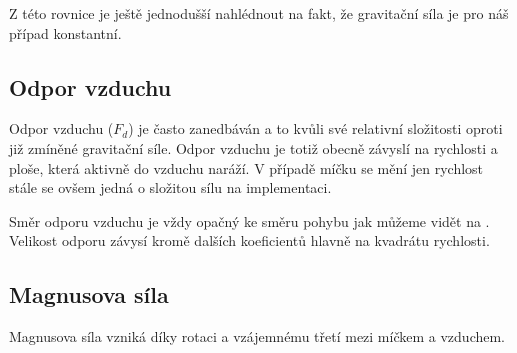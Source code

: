 Z této rovnice je ještě jednodušší nahlédnout na fakt, že gravitační síla je pro
náš případ konstantní. 


\subsection{Odpor vzduchu}
\label{ssec:odpor-vzduchu}

Odpor vzduchu ($F_d$) je často zanedbáván a to kvůli své relativní složitosti
oproti již zmíněné gravitační síle. Odpor vzduchu je totiž obecně závyslí na
rychlosti a ploše, která aktivně do vzduchu naráží. V případě míčku se mění jen
rychlost stále se ovšem jedná o složitou sílu na implementaci.

Směr odporu vzduchu je vždy opačný ke směru pohybu jak můžeme vidět na
. Velikost odporu závysí
kromě dalších koeficientů hlavně na kvadrátu rychlosti. 


\subsection{Magnusova síla}
\label{ssec:magnusova-sila}

Magnusova síla vzniká díky rotaci a vzájemnému třetí mezi míčkem a vzduchem.

